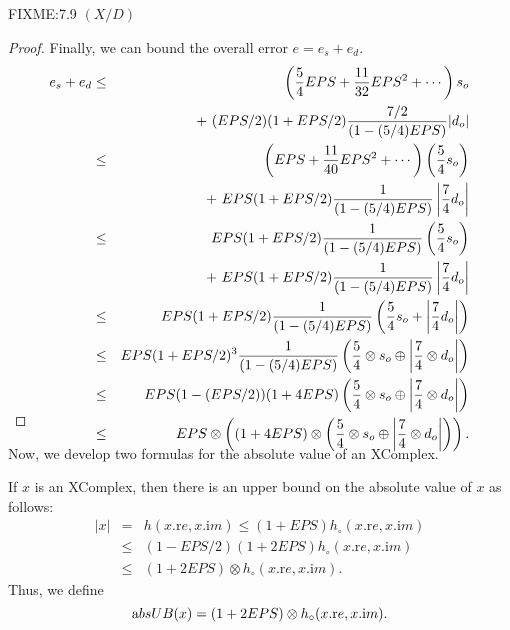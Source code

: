 \begin{definition}
\begin{proposition}{FIXME:7.9 $(X / D)$}
\begin{proof}{}
Finally, we can bound the overall error $e = e_s + e_d$.
\begin{eqnarray*}
e_s + e_d&\le& \left({5 \over 4} EPS + {11 \over 32} EPS^2 +\cdots\right) s_o\\
&& +\
 (EPS/2) (1+EPS/2)
 {7/2 \over (1 - (5/4)EPS)}|d_o|\\
&\le& \left( EPS + {11 \over 40} EPS^2 +\cdots\right) \left({5 \over 4} s_o\right) \\
&&+\
 EPS (1+EPS/2)
 {1 \over (1 - (5/4)EPS)}\left|{7 \over 4} d_o\right|\\
&\le& EPS (1+EPS/2)
 {1 \over (1 - (5/4)EPS)} \left({5 \over 4} s_o\right) \\
&&+
\  EPS (1+EPS/2)
 {1 \over (1 - (5/4)EPS)}\left|{7 \over 4} d_o\right|\\
&\le& EPS (1+EPS/2)
 {1 \over (1 - (5/4)EPS)}
\left({5 \over 4} s_o +\left|{7 \over 4} d_o\right|\right)\\
&\le& EPS (1+EPS/2)^3
 {1 \over (1 - (5/4)EPS)}
\left({5 \over 4} \otimes s_o \oplus \left|{7 \over 4} \otimes d_o\right|\right)\\
&\le& EPS (1 - (EPS/2))(1 + 4 EPS) 
\left({5 \over 4} \otimes s_o \oplus \left|{7 \over 4} \otimes d_o\right|\right)\\
&\le& EPS \otimes \left((1 + 4 EPS) \otimes
\left({5 \over 4} \otimes s_o \oplus \left|{7 \over 4} \otimes d_o\right|\right)\right).\\
\noalign{\vskip-36pt}
\end{eqnarray*}
\end{proof}
 
Now, we develop two formulas for the absolute value of an XComplex.
 

\begin{definition}
If $x$ is an XComplex, then
there is an upper bound on the absolute value of $x$ as follows:
\begin{eqnarray*}
|x| &=& h(x.{\mathrm re},x.{\mathrm im}) \le (1 + EPS) h_{\circ} (x.{\mathrm re},x.{\mathrm im})\\
&\le& (1 - EPS/2) (1 + 2EPS)h_{\circ} (x.{\mathrm re},x.{\mathrm im}) \\
&\le& (1 + 2EPS) \otimes h_{\circ} (x.{\mathrm re},x.{\mathrm im}).
\end{eqnarray*}
Thus, we define 
$${\textrm absUB}(x) = (1 + 2EPS) \otimes h_{\circ} (x.{\mathrm re},x.{\mathrm im}).$$ 
\end{definition}


\end{proposition}
\end{definition}
